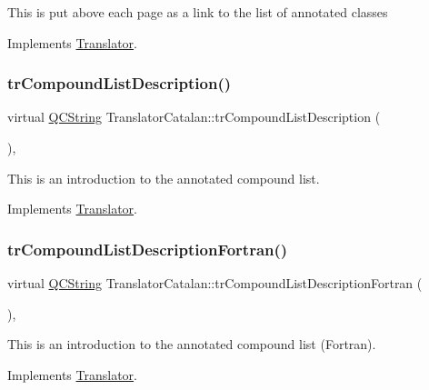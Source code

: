 This is put above each page as a link to the list of annotated classes 

Implements \mbox{\hyperlink{class_translator}{Translator}}.

\mbox{\label{class_translator_catalan_a485e539c4772b1e9764522224017ffd0}} 
\subsubsection{\texorpdfstring{trCompoundListDescription()}{trCompoundListDescription()}}
{\footnotesize\ttfamily virtual \mbox{\hyperlink{class_q_c_string}{Q\+C\+String}} Translator\+Catalan\+::tr\+Compound\+List\+Description (\begin{DoxyParamCaption}{ }\end{DoxyParamCaption})\hspace{0.3cm}{\ttfamily [inline]}, {\ttfamily [virtual]}}

This is an introduction to the annotated compound list. 

Implements \mbox{\hyperlink{class_translator}{Translator}}.

\mbox{\label{class_translator_catalan_ae4d0e0b7dfac92099f340fed437445ce}} 
\subsubsection{\texorpdfstring{trCompoundListDescriptionFortran()}{trCompoundListDescriptionFortran()}}
{\footnotesize\ttfamily virtual \mbox{\hyperlink{class_q_c_string}{Q\+C\+String}} Translator\+Catalan\+::tr\+Compound\+List\+Description\+Fortran (\begin{DoxyParamCaption}{ }\end{DoxyParamCaption})\hspace{0.3cm}{\ttfamily [inline]}, {\ttfamily [virtual]}}

This is an introduction to the annotated compound list (Fortran). 

Implements \mbox{\hyperlink{class_translator}{Translator}}.

